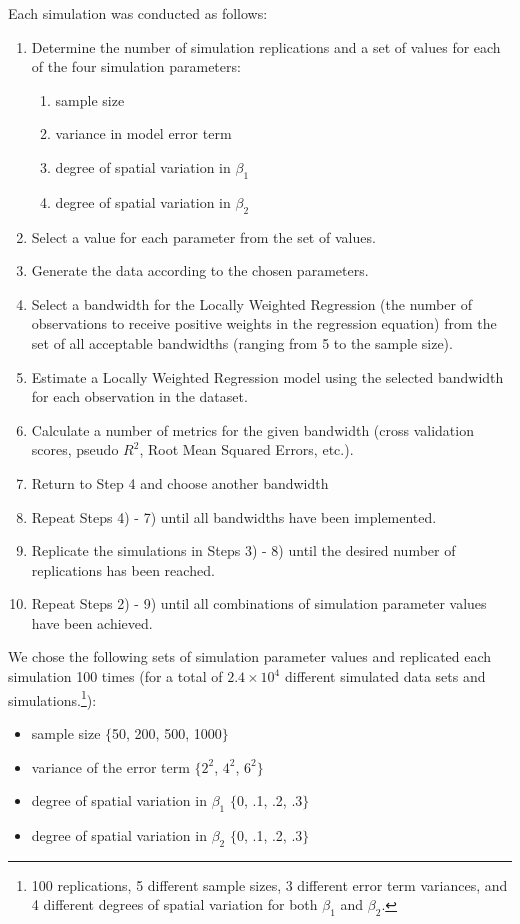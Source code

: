 \documentclass{article}\usepackage{graphicx, color}
\begin{document}
Each simulation was conducted as follows:
\begin{enumerate}
\item Determine the number of simulation replications and a set of values for each of the four simulation parameters: 
    \begin{enumerate}
    \item sample size
    \item variance in model error term
    \item degree of spatial variation in $\beta _1$
    \item degree of spatial variation in $\beta _2$
    \end{enumerate}
\item Select a value for each parameter from the set of values.
\item Generate the data according to the chosen parameters. 
\item Select a bandwidth for the Locally Weighted Regression (the number of observations to receive positive weights in the regression equation) from the set of all acceptable bandwidths (ranging from 5 to the sample size).
\item Estimate a Locally Weighted Regression model using the selected bandwidth for each observation in the dataset.
\item Calculate a number of metrics for the given bandwidth (cross validation scores, pseudo $R^2$, Root Mean Squared Errors, etc.).
\item Return to Step 4 and choose another bandwidth
\item Repeat Steps 4) - 7) until all bandwidths have been implemented.
\item Replicate the simulations in Steps 3) - 8) until the desired number of replications has been reached.
\item Repeat Steps 2) - 9) until all combinations of simulation parameter values have been achieved.
\end{enumerate}

We chose the following sets of simulation parameter values and replicated each simulation 100 times (for a total of $2.4\times 10^{4}$ different simulated data sets and simulations.\footnote{100 replications, 5 different sample sizes, 3 different error term variances, and 4 different degrees of spatial variation for both $\beta _1$ and $\beta _2$.}):
\begin{itemize}
\item sample size $\{$50, 200, 500, 1000$\}$
\item variance of the error term $\{2^2$, $4^2$, $6^2\}$
\item degree of spatial variation in $\beta _1$  $\{0$, .1, .2, .3$\}$
\item degree of spatial variation in $\beta _2$  $\{$0, .1, .2, .3$\}$
\end{itemize}
\end{document}
